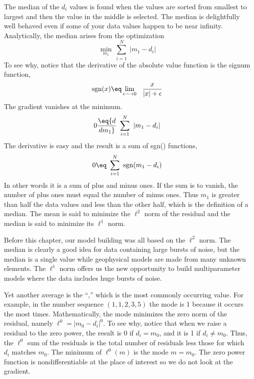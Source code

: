 \par
The median of the $d_i$ values
is found when the values are sorted from smallest to largest
and then the value in the middle is selected.
The median is delightfully well behaved even
if some of your data values happen to be near infinity.
Analytically,
the median arises from the optimization
\begin{equation}
\min_{m_1}\ \sum_{i=1}^N \ |m_1-d_i|
\end{equation}
To see why, notice that the derivative of the absolute value
function is the signum function,
\begin{equation}
{\rm sgn}(x) \eq \lim_{\epsilon \longrightarrow 0} \ \ 
                { x \over |x| + \epsilon }
\end{equation}
The gradient vanishes at the minimum.
\begin{equation}
0 \eq {d \over dm_1} \ \sum_{i=1}^N \ |m_1-d_i|                 
\end{equation}
The derivative is easy and the result is a sum of sgn() functions,
\begin{equation}
0 \eq                \ \sum_{i=1}^N \ {\rm sgn}(m_1-d_i)
\end{equation}
In other words it is a sum of plus and minus ones.
If the sum is to vanish, the number of plus ones
must equal the number of minus ones.
Thus $m_1$ is greater than half the data values and less than the other half,
which is the definition of a median.
The mean is said to minimize the $\ell^2$ norm of the residual
and the median is said to minimize its $\ell^1$ norm.

\par
Before this chapter,
our model building was all based on the $\ell^2$ norm.
The median is clearly a good idea
for data containing large bursts of noise,
but the median is a single value while geophysical models
are made from many unknown elements.
The $\ell^1$ norm offers us the new opportunity
to build multiparameter models
where the data includes huge bursts of noise.

\par
Yet another average is the ``,''
which is the most commonly occurring value.
For example, in the number sequence $(1,1,2,3,5)$ the mode is 1
because it occurs the most times.
Mathematically, the mode minimizes the zero norm of the residual,
namely $\ell^0=|m_0-d_i|^0$.
To see why, notice that when we raise a residual to the zero power,
the result is 0 if $d_i=m_0$, and it is 1 if $d_i \ne m_0$.
Thus, the $\ell^0$ sum of the residuals
is the total number of residuals less those for which $d_i$ matches $m_0$.
The minimum of $\ell^0(m)$ is the mode $m=m_0$.
The zero power function is nondifferentiable at the place of interest so
we do not look at the gradient.

